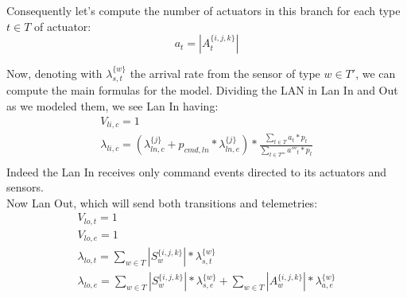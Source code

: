 \documentclass[11pt]{article}
\begin{document}
Consequently let's compute the number of actuators in this branch for each type $t \in T$ of actuator:
\begin{equation}
    a_{t} = | A^{\{i, j, k\}}_{t} |
\end{equation}

Now, denoting with $\lambda^{\{w\}}_{s, t}$ the arrival rate from the sensor of type $w \in T'$, we can compute the main formulas for the model.
Dividing the LAN in Lan In and Out as we modeled them, we see Lan In having:
\begin{equation}
    \begin{array}{l}
        V_{li,c} = 1 \\
        \lambda_{li, c} = (\lambda^{\{j\}}_{ln, c} + p_{cmd,ln} * \lambda^{\{j\}}_{ln, e}) * \frac{\sum\limits_{t \in T}{a_{t} * p_{t}}}{\sum\limits_{t \in T'''}{a'''_{t} * p_{t}}}  \\\

    \end{array}
\end{equation}
Indeed the Lan In receives only command events  directed to its actuators and sensors.\\
Now Lan Out, which will send both transitions and telemetries:
\begin{equation}
    \begin{array}{l}
        V_{lo, t} = 1 \\
        V_{lo, e} = 1 \\ %
        \lambda_{lo, t} = \sum\limits_{w \in T}{| S^{\{i,j,k\}}_{w} | * \lambda^{\{w\}}_{s, t}}  \\
        \lambda_{lo, e} = \sum\limits_{w \in T}{| S^{\{i,j,k\}}_{w} | * \lambda^{\{w\}}_{s, e}} + \sum\limits_{w \in T}{| A^{\{i,j,k\}}_{w} | * \lambda^{\{w\}}_{a, e}}\\


    \end{array}
\end{equation}
\end{document}
